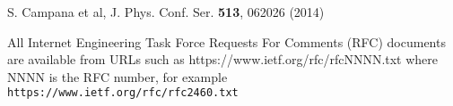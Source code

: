 \begin{thebibliography}{}
%
%


S. Campana et al, J. Phys. Conf. Ser. {\bf513}, 062026 (2014)






All Internet Engineering Task Force Requests For Comments (RFC) documents are available
from URLs such as https://www.ietf.org/rfc/rfcNNNN.txt where NNNN is the RFC number, for example {\tt https://www.ietf.org/rfc/rfc2460.txt}












\end{thebibliography}
